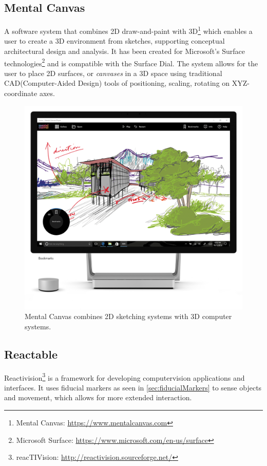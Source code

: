 		\subsection{Mental Canvas}
			A software system that combines 2D draw-and-paint with 3D\footnote{Mental Canvas: \url{https://www.mentalcanvas.com}} which enables a user to create a 3D environment from sketches, supporting conceptual architectural design and analysis. It has been created for Microsoft's Surface technologies\footnote{Microsoft Surface: \url{https://www.microsoft.com/en-us/surface}} and is compatible with the Surface Dial. The system allows for the user to place 2D surfaces, or \textit{canvases} in a 3D space using traditional CAD(Computer-Aided Design) tools of positioning, scaling, rotating on XYZ-coordinate axes.\cite{sotaMentalCanvas}
			
				\begin{figure}[H]
					\centering
					\includegraphics[width=0.5\linewidth]{figure/Analysis/mentalCanvas.png}
					\caption{Mental Canvas combines 2D sketching systems with 3D computer systems.}
					\label{fig:mentalCanvas}
				\end{figure}

		
		\subsection{Reactable}
			Reactivision\footnote{reacTIVision: \url{http://reactivision.sourceforge.net/}} is a framework for developing computervision applications and interfaces. It uses fiducial markers as seen in  \autoref{sec:fiducialMarkers} to sense objects and movement, which allows for more extended interaction. \\
			
